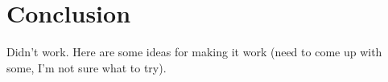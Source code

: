 \documentclass[etd,oneside,senior]{BYUPhys}
\begin{document}

\chapter{Conclusion}\label{chap:conclusion}

Didn't work. Here are some ideas for making it work (need to come up with some, I'm not sure what to try).






\end{document}
